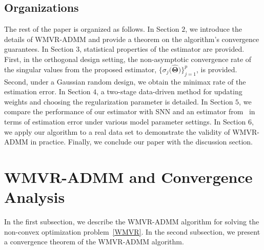 \documentclass[alpha-refs]{wiley-article}
\begin{document}
\subsection{Organizations}
The rest of the paper is organized as follows.
In Section $2$, we introduce the details of WMVR-ADMM and provide a theorem on the algorithm's convergence guarantees.
In Section $3$, statistical properties of the estimator are provided.
First, in the orthogonal design setting, the non-asymptotic convergence rate of the singular values from the proposed estimator, $\{\sigma_{j}\big(\widehat{\boldsymbol{\Theta}}\big)\}_{j=1}^{p}$, is provided.
Second, under a Gaussian random design, we obtain the minimax rate of the estimation error.
In Section $4$, a two-stage data-driven method for updating weights and choosing the regularization parameter is detailed.
In Section $5$, we compare the performance of our estimator with SNN and an estimator from~\citet{chen2013reduced} in terms of estimation error under various model parameter settings.
In Section $6$, we apply our algorithm to a real data set to demonstrate the validity of WMVR-ADMM in practice.
Finally, we conclude our paper with the discussion section.

\section{WMVR-ADMM and Convergence Analysis}
In the first subsection, we describe the WMVR-ADMM algorithm for solving the non-convex optimization  problem~\eqref{WMVR}.
In the second subsection, we present a convergence theorem of the WMVR-ADMM algorithm.
\end{document}
